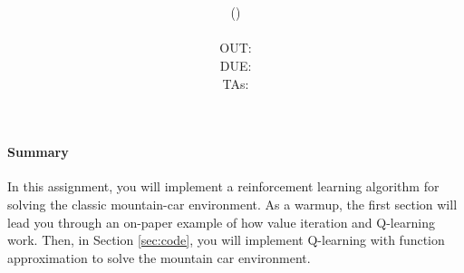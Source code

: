\documentclass[11pt,addpoints,answers]{exam}
\title{\textsc{\hwName}
} %
\author{\textsc{\large \courseNum{} \courseName{} (\courseSem)}\\
\courseUrl 
\vspace*{0.5em}\\
  OUT: \outDate \\
  DUE: \dueDate \\
  TAs: \taNames\\
}
\date{}
\date{}
\begin{document}
\maketitle

\begin{notebox}
\paragraph{Summary} In this assignment, you will implement a reinforcement learning algorithm for solving the classic mountain-car environment. As a warmup, the first section will lead you through an on-paper example of how value iteration and Q-learning work. Then, in Section \ref{sec:code}, you will implement Q-learning with function approximation to solve the mountain car environment.
\end{notebox}\newcommand \maxsubs {10 }
\end{document}
